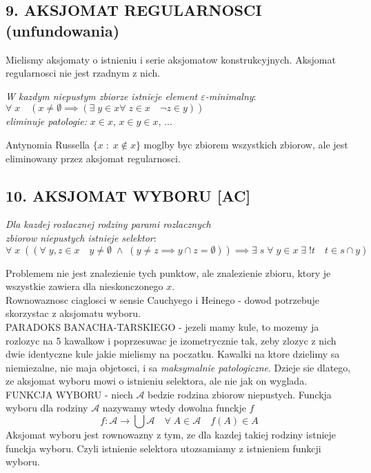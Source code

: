 \documentclass{article}
\begin{document}
\subsection*{9. AKSJOMAT REGULARNOSCI \color{txt}(unfundowania)}
  Mielismy aksjomaty o istnieniu i serie aksjomatow konstrukcyjnych. Aksjomat regularnosci nie jest rzadnym z nich.
  \begin{center}
    \emph{\color{emp}W kazdym niepustym zbiorze istnieje element $\varepsilon$-minimalny}:\smallskip\\
    $\forall\;x\quad (x\neq\emptyset\implies (\exists\;y\in x\forall\;z\in x\quad \neg z\in y))$\smallskip\\
    \color{acc}\emph{eliminuje patologie: }$x\in x$, $x\in y\in x$, ...
  \end{center}
  Antynomia Russella $\{x\;:\;x\notin x\}$ moglby byc zbiorem wszystkich zbiorow, ale jest eliminowany przez aksjomat regularnosci.
\subsection*{10. AKSJOMAT WYBORU [AC]}
  \begin{center}
    \emph{\color{emp}Dla kazdej rozlacznej rodziny parami rozlacznych \\zbiorow niepustych istnieje selektor}:\smallskip\\
    $\forall\;x\;((\forall\;y,z\in x\quad y\neq\emptyset\;\land\;(y\neq z\implies y\cap z=\emptyset))\implies\exists\;s\;\forall\;y\in x\;\exists\;!t\quad t\in s\cap y)$
  \end{center}
  Problemem nie jest znalezienie tych punktow, ale znalezienie zbioru, ktory je wszystkie zawiera dla nieskonczonego $x$.\medskip\\
  Rownowaznosc ciaglosci w sensie Cauchyego i Heinego - dowod potrzebuje skorzystac z aksjomatu wyboru.\medskip\\
  \color{def}PARADOKS BANACHA-TARSKIEGO \color{txt}- jezeli mamy kule, to mozemy ja rozlozyc na 5 kawalkow i poprzesuwac je izometrycznie tak, zeby zlozyc z nich dwie identyczne kule jakie mielismy na poczatku. Kawalki na ktore dzielimy sa niemiezalne, nie maja objetosci, i sa \emph{maksymalnie patologiczne}. Dzieje sie dlatego, ze aksjomat wyboru \color{acc}mowi o istnieniu selektora, ale nie jak on wyglada\color{txt}.\bigskip\\
  \color{def}FUNKCJA WYBORU \color{txt}- niech $\mathcal{A}$ bedzie rodzina zbiorow niepustych. Funckja wyboru dla rodziny $\mathcal{A}$ nazywamy wtedy dowolna funckje $f$
  $$f:\mathcal{A}\to\bigcup\mathcal{A}\quad \forall\;A\in\mathcal{A}\quad f(A)\in A$$
  Aksjomat wyboru jest rownowazny z tym, ze dla kazdej takiej rodziny istnieje funckja wyboru. Czyli istnienie selektora utozsamiamy z istnieniem funkcji wyboru.
\end{document}
